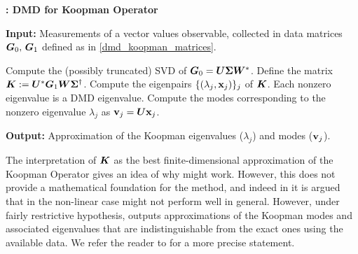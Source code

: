 \begin{algorithm}[h]
\caption{\textbf{: DMD for Koopman Operator}}
\label{alg_koopman_dmd}
\textbf{Input:} Measurements of a vector values observable, collected in data matrices $\vb*{G}_0,\,\vb*{G}_1$ defined as in \eqref{dmd_koopman_matrices}.
\begin{algorithmic}[1]
\State Compute the (possibly truncated) SVD of $\vb*{G}_0 = \vb*{U}\vb*{\Sigma}\vb*{W}^*$.
\State Define the matrix $\vb*{K} := \vb*{U}^*\vb*{G}_1\vb*{W}\vb*{\Sigma}^{\dagger}$.
\State Compute the eigenpairs $\{(\lambda_j, \vb{x}_j)\}_j$ of $\vb*{K}$. Each nonzero eigenvalue is a DMD eigenvalue.
\State Compute the modes corresponding to the nonzero eigenvalue $\lambda_j$ as $\vb{v}_j = \vb*{U}\vb{x}_j$. 
\end{algorithmic}
\textbf{Output:} Approximation of the Koopman eigenvalues ($\lambda_j$) and modes ($\vb{v}_j$).
\end{algorithm}


The interpretation of $\vb*{K}$ as the best finite-dimensional approximation of the Koopman Operator gives an idea of why  might work. However, this does not provide a mathematical foundation for the method, and indeed in \cite{tu_dynamic_2014, bagheri_koopman-mode_2013} it is argued that in the non-linear case  might not perform well in general. However, under fairly restrictive hypothesis,  outputs approximations of the Koopman modes and associated eigenvalues that are indistinguishable from the exact ones using the available data. We refer the reader to \cite{rowley_spectral_2009, tu_dynamic_2014} for a more precise statement.
